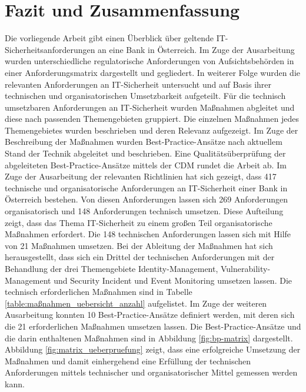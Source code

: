 \setlength{\parindent}{0em} 

\chapter{Fazit und Zusammenfassung}
\label{cha:fazit_und_zusammenfassung}
Die vorliegende Arbeit gibt einen Überblick über geltende IT-Sicherheitsanforderungen an eine Bank in Österreich. Im Zuge der Ausarbeitung wurden unterschiedliche regulatorische Anforderungen von Aufsichtsbehörden in einer Anforderungsmatrix dargestellt und gegliedert. In weiterer Folge wurden die relevanten Anforderungen an IT-Sicherheit untersucht und auf Basis ihrer technischen und organisatorischen Umsetzbarkeit aufgeteilt. Für die technisch umsetzbaren Anforderungen an IT-Sicherheit wurden Maßnahmen abgleitet und diese nach passenden Themengebieten gruppiert. Die einzelnen Maßnahmen jedes Themengebietes wurden beschrieben und deren Relevanz aufgezeigt. Im Zuge der Beschreibung der Maßnahmen wurden Best-Practice-Ansätze nach aktuellem Stand der Technik abgeleitet und beschrieben. Eine Qualitätsüberprüfung der abgeleiteten Best-Practice-Ansätze mittels der CDM rundet die Arbeit ab.
\bigbreak
Im Zuge der Ausarbeitung der relevanten Richtlinien hat sich gezeigt, dass 417 technische und organisatorische Anforderungen an IT-Sicherheit einer Bank in Österreich bestehen. Von diesen Anforderungen lassen sich 269 Anforderungen organisatorisch und 148 Anforderungen technisch umsetzen. Diese Aufteilung zeigt, dass das Thema IT-Sicherheit zu einem großen Teil organisatorische Maßnahmen erfordert. Die 148 technischen Anforderungen lassen sich mit Hilfe von 21 Maßnahmen umsetzen. Bei der Ableitung der Maßnahmen hat sich herausgestellt, dass sich ein Drittel der technischen Anforderungen mit der Behandlung der drei Themengebiete \glqq{}Identity-Management\grqq{}, \glqq{}Vulnerability-Management\grqq{} und \glqq{}Security Incident und Event Monitoring\grqq{} umsetzen lassen. Die technisch erforderlichen Maßnahmen sind in Tabelle \ref{table:maßnahmen_uebersicht_anzahl} aufgelistet. Im Zuge der weiteren Ausarbeitung konnten 10 Best-Practice-Ansätze definiert werden, mit deren sich die 21 erforderlichen Maßnahmen umsetzen lassen. Die Best-Practice-Ansätze und die darin enthaltenen Maßnahmen sind in Abbildung \ref{fig:bp-matrix} dargestellt. Abbildung \ref{fig:matrix_ueberpruefung} zeigt, dass eine erfolgreiche Umsetzung der Maßnahmen und damit einhergehend eine Erfüllung der technischen Anforderungen mittels technischer und organisatorischer Mittel gemessen werden kann. 
